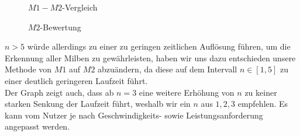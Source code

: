 \documentclass[11pt,a4paper]{article}
\newcommand{\ms}{\mathrm{ms}}
\begin{document}
\begin{figure}[H]
    \begin{center}
    \begin{minipage}{.45\textwidth}
        \caption{$M1-M2$-Vergleich}
    \end{minipage}
    \begin{minipage}{.45\textwidth}
        \caption{$M2$-Bewertung}
    \end{minipage}
    \end{center}
\end{figure}
$n > 5$ würde allerdings zu einer zu geringen zeitlichen Auflösung führen, um die Erkennung aller Milben zu gewährleisten, haben wir uns dazu entschieden unsere Methode von $M1$ auf $M2$ abzuändern, da diese auf dem Intervall $n \in [1, 5]$ zu einer deutlich geringeren Laufzeit führt.\\
Der Graph zeigt auch, dass ab $n = 3$ eine weitere Erhöhung von $n$ zu keiner starken Senkung der Laufzeit führt, weshalb wir ein $n$ aus ${1, 2, 3}$ empfehlen. Es kann vom Nutzer je nach Geschwindigkeits- sowie Leistungsanforderung angepasst werden.
\end{document}
